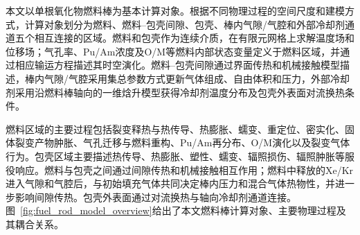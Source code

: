 本文以单根氧化物燃料棒为基本计算对象。根据不同物理过程的空间尺度和建模方式，计算对象划分为燃料、燃料--包壳间隙、包壳、棒内气隙/气腔和外部冷却剂通道五个相互连接的区域。燃料和包壳作为连续介质，在有限元网格上求解温度场和位移场；气孔率、Pu/Am浓度及O/M等燃料内部状态变量定义于燃料区域，并通过相应输运方程描述其时空演化。燃料--包壳间隙通过界面传热和机械接触模型描述，棒内气隙/气腔采用集总参数方式更新气体组成、自由体积和压力，外部冷却剂采用沿燃料棒轴向的一维{\rarecharfont 焓}升模型获得冷却剂温度分布及包壳外表面对流换热条件。

燃料区域的主要过程包括裂变释热与热传导、热膨胀、蠕变、重定位、密实化、固体裂变产物肿胀、气孔迁移与燃料重构、Pu/Am再分布、O/M演化以及裂变气体行为。包壳区域主要描述热传导、热膨胀、塑性、蠕变、辐照损伤、辐照肿胀等服役响应。燃料与包壳之间通过间隙传热和机械接触相互作用；燃料中释放的Xe/Kr进入气隙和气腔后，与初始填充气体共同决定棒内压力和混合气体热物性，并进一步影响间隙传热。包壳外表面通过对流换热与轴向冷却剂通道连接。图~\ref{fig:fuel_rod_model_overview}给出了本文燃料棒计算对象、主要物理过程及其耦合关系。

